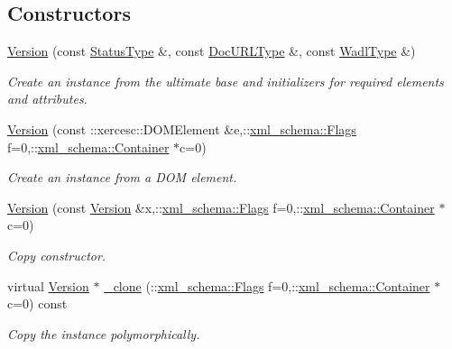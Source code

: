 \subsection*{Constructors}
\begin{DoxyCompactItemize}
\item 
\hypertarget{classopenstack_1_1xml_1_1Version_ac22096b20bb86997a31d1aa40dfd0dad}{
\hyperlink{classopenstack_1_1xml_1_1Version_ac22096b20bb86997a31d1aa40dfd0dad}{Version} (const \hyperlink{classopenstack_1_1xml_1_1VersionStatus}{StatusType} \&, const \hyperlink{classopenstack_1_1xml_1_1Version_aed74beb6af9dc70c3ec21ba445627cec}{DocURLType} \&, const \hyperlink{classopenstack_1_1xml_1_1Version_a5a0dce1b88ef63c4fd363ef4f2754a79}{WadlType} \&)}
\label{classopenstack_1_1xml_1_1Version_ac22096b20bb86997a31d1aa40dfd0dad}

\begin{DoxyCompactList}\small\item\em Create an instance from the ultimate base and initializers for required elements and attributes. \item\end{DoxyCompactList}\item 
\hyperlink{classopenstack_1_1xml_1_1Version_a4f747dd9fc6f2273e2a3870680c75b6d}{Version} (const ::xercesc::DOMElement \&e,::\hyperlink{namespacexml__schema_affb4c227cbd9aa7453dd1dc5a1401943}{xml\_\-schema::Flags} f=0,::\hyperlink{namespacexml__schema_a333dea2213742aea47a37532dec4ec27}{xml\_\-schema::Container} $\ast$c=0)
\begin{DoxyCompactList}\small\item\em Create an instance from a DOM element. \item\end{DoxyCompactList}\item 
\hyperlink{classopenstack_1_1xml_1_1Version_a90a95e96a4f86960433d998528c66ac1}{Version} (const \hyperlink{classopenstack_1_1xml_1_1Version}{Version} \&x,::\hyperlink{namespacexml__schema_affb4c227cbd9aa7453dd1dc5a1401943}{xml\_\-schema::Flags} f=0,::\hyperlink{namespacexml__schema_a333dea2213742aea47a37532dec4ec27}{xml\_\-schema::Container} $\ast$c=0)
\begin{DoxyCompactList}\small\item\em Copy constructor. \item\end{DoxyCompactList}\item 
virtual \hyperlink{classopenstack_1_1xml_1_1Version}{Version} $\ast$ \hyperlink{classopenstack_1_1xml_1_1Version_ab02ba92c1eae8dd13c46388c4a0f73d4}{\_\-clone} (::\hyperlink{namespacexml__schema_affb4c227cbd9aa7453dd1dc5a1401943}{xml\_\-schema::Flags} f=0,::\hyperlink{namespacexml__schema_a333dea2213742aea47a37532dec4ec27}{xml\_\-schema::Container} $\ast$c=0) const 
\begin{DoxyCompactList}\small\item\em Copy the instance polymorphically. \item\end{DoxyCompactList}\end{DoxyCompactItemize}


